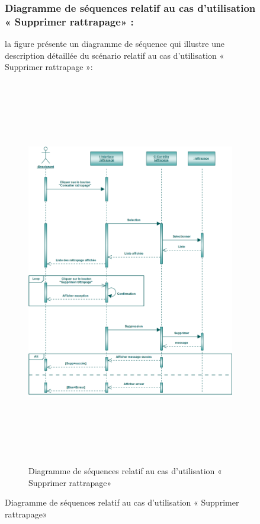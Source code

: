 \documentclass[12 pt]{report}
\begin{document}
\begin{figure}[h]
\begin{center}
\subsubsection{Diagramme de séquences relatif au cas d’utilisation « Supprimer rattrapage» :}
la figure   présente un diagramme de séquence qui illustre une description détaillée du scénario relatif au cas d’utilisation « Supprimer rattrapage »: 
\begin{figure}[h]
 \begin{center}
\includegraphics[width= 18 cm ,height=  17cm]{ssr.PNG}
\caption{Diagramme de séquences relatif au cas d’utilisation « Supprimer rattrapage»}

\end{center}
\end{figure}

\end{center}
\end{figure}
\end{document}
